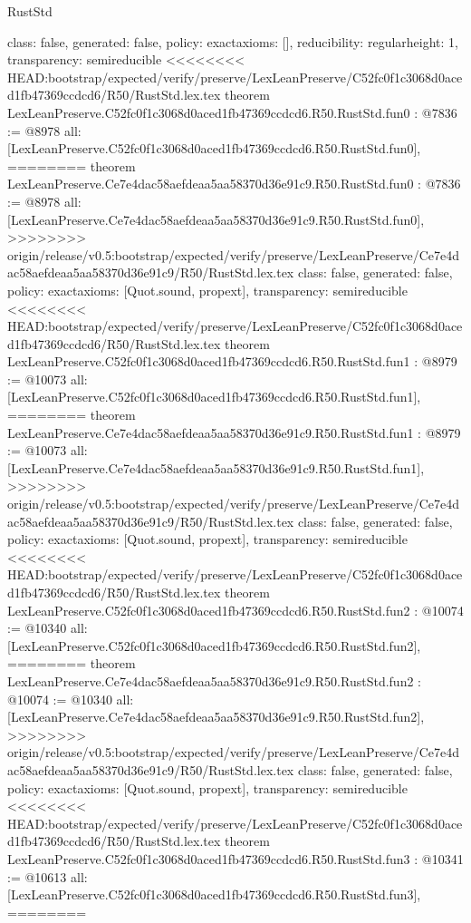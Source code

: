 \begin{lexlean}{RustStd}
\begin{coremodule}
{\begin{coremodule}
{{{  class: false,
  generated: false,
  policy: exact{axioms: []},
  reducibility: regular{height: 1},
  transparency: semireducible
}
<<<<<<<< HEAD:bootstrap/expected/verify/preserve/LexLeanPreserve/C52fc0f1c3068d0aced1fb47369ccdcd6/R50/RustStd.lex.tex
theorem LexLeanPreserve.C52fc0f1c3068d0aced1fb47369ccdcd6.R50.RustStd.fun0 : @7836 := @8978 {
  all: [LexLeanPreserve.C52fc0f1c3068d0aced1fb47369ccdcd6.R50.RustStd.fun0],
========
theorem LexLeanPreserve.Ce7e4dac58aefdeaa5aa58370d36e91c9.R50.RustStd.fun0 : @7836 := @8978 {
  all: [LexLeanPreserve.Ce7e4dac58aefdeaa5aa58370d36e91c9.R50.RustStd.fun0],
>>>>>>>> origin/release/v0.5:bootstrap/expected/verify/preserve/LexLeanPreserve/Ce7e4dac58aefdeaa5aa58370d36e91c9/R50/RustStd.lex.tex
  class: false,
  generated: false,
  policy: exact{axioms: [Quot.sound, propext]},
  transparency: semireducible
}
<<<<<<<< HEAD:bootstrap/expected/verify/preserve/LexLeanPreserve/C52fc0f1c3068d0aced1fb47369ccdcd6/R50/RustStd.lex.tex
theorem LexLeanPreserve.C52fc0f1c3068d0aced1fb47369ccdcd6.R50.RustStd.fun1 : @8979 := @10073 {
  all: [LexLeanPreserve.C52fc0f1c3068d0aced1fb47369ccdcd6.R50.RustStd.fun1],
========
theorem LexLeanPreserve.Ce7e4dac58aefdeaa5aa58370d36e91c9.R50.RustStd.fun1 : @8979 := @10073 {
  all: [LexLeanPreserve.Ce7e4dac58aefdeaa5aa58370d36e91c9.R50.RustStd.fun1],
>>>>>>>> origin/release/v0.5:bootstrap/expected/verify/preserve/LexLeanPreserve/Ce7e4dac58aefdeaa5aa58370d36e91c9/R50/RustStd.lex.tex
  class: false,
  generated: false,
  policy: exact{axioms: [Quot.sound, propext]},
  transparency: semireducible
}
<<<<<<<< HEAD:bootstrap/expected/verify/preserve/LexLeanPreserve/C52fc0f1c3068d0aced1fb47369ccdcd6/R50/RustStd.lex.tex
theorem LexLeanPreserve.C52fc0f1c3068d0aced1fb47369ccdcd6.R50.RustStd.fun2 : @10074 := @10340 {
  all: [LexLeanPreserve.C52fc0f1c3068d0aced1fb47369ccdcd6.R50.RustStd.fun2],
========
theorem LexLeanPreserve.Ce7e4dac58aefdeaa5aa58370d36e91c9.R50.RustStd.fun2 : @10074 := @10340 {
  all: [LexLeanPreserve.Ce7e4dac58aefdeaa5aa58370d36e91c9.R50.RustStd.fun2],
>>>>>>>> origin/release/v0.5:bootstrap/expected/verify/preserve/LexLeanPreserve/Ce7e4dac58aefdeaa5aa58370d36e91c9/R50/RustStd.lex.tex
  class: false,
  generated: false,
  policy: exact{axioms: [Quot.sound, propext]},
  transparency: semireducible
}
<<<<<<<< HEAD:bootstrap/expected/verify/preserve/LexLeanPreserve/C52fc0f1c3068d0aced1fb47369ccdcd6/R50/RustStd.lex.tex
theorem LexLeanPreserve.C52fc0f1c3068d0aced1fb47369ccdcd6.R50.RustStd.fun3 : @10341 := @10613 {
  all: [LexLeanPreserve.C52fc0f1c3068d0aced1fb47369ccdcd6.R50.RustStd.fun3],
========
}}}}}}
\end{coremodule}}
\end{coremodule}
\end{lexlean}
